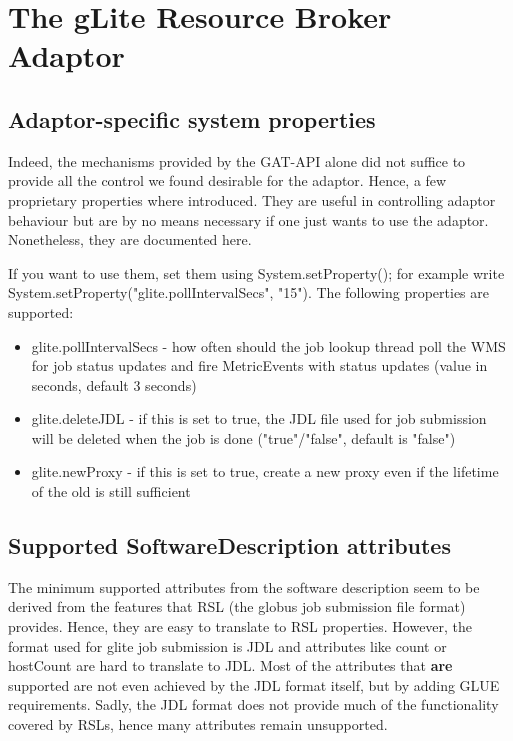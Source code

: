 \documentclass{scrreprt}
\begin{document}
\chapter{The gLite Resource Broker Adaptor} 

\section{Adaptor-specific system properties}

Indeed, the mechanisms provided by the GAT-API alone did not suffice to provide all the control we found 
desirable for the adaptor. Hence, a few proprietary properties where introduced. They are useful
in controlling adaptor behaviour but are by no means necessary if one just wants to use the adaptor.
Nonetheless, they are documented here.
 
If you want to use them, set them using System.setProperty(); for example write 
System.setProperty("glite.pollIntervalSecs", "15").
The following properties are supported:

\begin{itemize}
 \item glite.pollIntervalSecs - how often should the job lookup thread poll the WMS for job status updates and fire MetricEvents with status updates (value in seconds, default 3 seconds)
 \item glite.deleteJDL - if this is set to true, the JDL file used for job submission will be deleted when the job is done ("true"/"false", default is "false")
 \item glite.newProxy - if this is set to true, create a new proxy even if the lifetime of the old is still sufficient
\end{itemize}

\section{Supported SoftwareDescription attributes}

The minimum supported attributes from the software description seem to be derived from the features
that RSL (the globus job submission file format) provides. Hence, they are easy to translate to RSL 
properties.
However, the format used for glite job submission is JDL and attributes like count or hostCount are
hard to translate to JDL. Most of the attributes that \textbf{are} supported are not even achieved by the JDL
format itself, but by adding GLUE requirements.
Sadly, the JDL format does not provide much of the functionality covered by RSLs, hence many attributes
remain unsupported.
 
\end{document}
